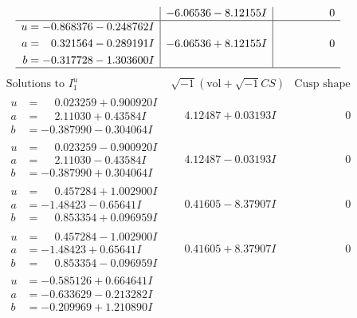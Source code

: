 \documentclass[1p]{elsarticle_modified}
\theoremstyle{definition}
\newcommand{\I}{\sqrt{-1}}
\begin{document}
$$\begin{array}{c|c|c}
 & -6.06536 - 8.12155 I & \phantom{-0.000000 } 0 \\ \hline\begin{aligned}
u &= -0.868376 - 0.248762 I \\
a &= \phantom{-}0.321564 - 0.289191 I \\
b &= -0.317728 - 1.303600 I\end{aligned}
 & -6.06536 + 8.12155 I & \phantom{-0.000000 } 0\\
 \hline 
 \end{array}$$\newpage$$\begin{array}{c|c|c}  
\text{Solutions to }I^u_{1}& \I (\text{vol} + \sqrt{-1}CS) & \text{Cusp shape}\\
 \hline 
\begin{aligned}
u &= \phantom{-}0.023259 + 0.900920 I \\
a &= \phantom{-}2.11030 + 0.43584 I \\
b &= -0.387990 - 0.304064 I\end{aligned}
 & \phantom{-}4.12487 + 0.03193 I & \phantom{-0.000000 } 0 \\ \hline\begin{aligned}
u &= \phantom{-}0.023259 - 0.900920 I \\
a &= \phantom{-}2.11030 - 0.43584 I \\
b &= -0.387990 + 0.304064 I\end{aligned}
 & \phantom{-}4.12487 - 0.03193 I & \phantom{-0.000000 } 0 \\ \hline\begin{aligned}
u &= \phantom{-}0.457284 + 1.002900 I \\
a &= -1.48423 - 0.65641 I \\
b &= \phantom{-}0.853354 + 0.096959 I\end{aligned}
 & \phantom{-}0.41605 - 8.37907 I & \phantom{-0.000000 } 0 \\ \hline\begin{aligned}
u &= \phantom{-}0.457284 - 1.002900 I \\
a &= -1.48423 + 0.65641 I \\
b &= \phantom{-}0.853354 - 0.096959 I\end{aligned}
 & \phantom{-}0.41605 + 8.37907 I & \phantom{-0.000000 } 0 \\ \hline\begin{aligned}
u &= -0.585126 + 0.664641 I \\
a &= -0.633629 - 0.213282 I \\
b &= -0.209969 + 1.210890 I\end{aligned}

\end{array}$$
\end{document}
